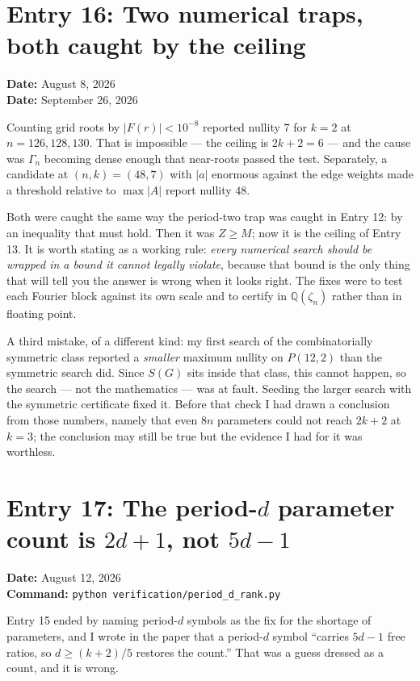 \documentclass[12pt]{article}
\begin{document}
\clearpage
\section*{Entry 16: Two numerical traps, both caught by the ceiling}
\textbf{Date:} August 8, 2026\\
\textbf{Date:} September 26, 2026

Counting grid roots by $|F(r)|<10^{-8}$ reported nullity $7$ for $k=2$ at
$n=126,128,130$. That is impossible --- the ceiling is $2k+2=6$ --- and the
cause was $\Gamma_n$ becoming dense enough that near-roots passed the test.
Separately, a candidate at $(n,k)=(48,7)$ with $|a|$ enormous against the edge
weights made a threshold relative to $\max|A|$ report nullity $48$.

Both were caught the same way the period-two trap was caught in Entry 12: by an
inequality that must hold. Then it was $Z\ge M$; now it is
the ceiling of Entry 13. It is worth stating as a working rule:
\emph{every numerical search should be wrapped in a bound it cannot legally
violate}, because that bound is the only thing that will tell you the answer is
wrong when it looks right. The fixes were to test each Fourier block against
its own scale and to certify in $\mathbb Q(\zeta_n)$ rather than in floating
point.

A third mistake, of a different kind: my first search of the combinatorially
symmetric class reported a \emph{smaller} maximum nullity on $P(12,2)$ than the
symmetric search did. Since $S(G)$ sits inside that class, this cannot happen,
so the search --- not the mathematics --- was at fault. Seeding the larger search
with the symmetric certificate fixed it. Before that check I had drawn a
conclusion from those numbers, namely that even $8n$ parameters could not reach
$2k+2$ at $k=3$; the conclusion may still be true but the evidence I had for it
was worthless.


\clearpage
\section*{Entry 17: The period-$d$ parameter count is $2d+1$, not $5d-1$}
\textbf{Date:} August 12, 2026\\
\textbf{Command:} {\small\texttt{python verification/period\_d\_rank.py}}

Entry 15 ended by naming period-$d$ symbols as the fix for the shortage of
parameters, and I wrote in the paper that a period-$d$ symbol ``carries $5d-1$
free ratios, so $d\ge(k+2)/5$ restores the count.'' That was a guess dressed as
a count, and it is wrong.
\end{document}
